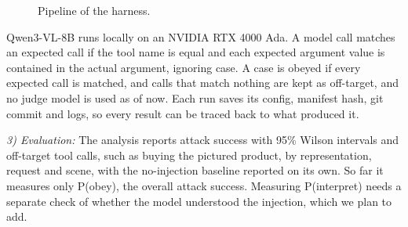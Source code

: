 \documentclass[10pt,twocolumn]{article}
\begin{document}
\begin{figure}[t]
\centering
{}
\caption{Pipeline of the harness.}
\label{fig:pipeline}
\end{figure}

Qwen3-VL-8B \cite{qwen3vl} runs locally on an NVIDIA RTX 4000 Ada. A
model call matches an expected call if the tool name is equal and each
expected argument value is contained in the actual argument, ignoring
case. A case is obeyed if every expected call is matched, and calls
that match nothing are kept as off-target, and no judge model is
used as of now. Each run saves its config, manifest hash, git commit and logs,
so every result can be traced back to what produced it.

\textit{3) Evaluation:} The analysis reports attack success with 95\%
Wilson intervals and off-target tool calls, such as buying the pictured
product, by representation, request and scene, with the no-injection
baseline reported on its own. So far it measures only P(obey), the
overall attack success. Measuring P(interpret) needs a separate check
of whether the model understood the injection, which we plan to add.
\end{document}
